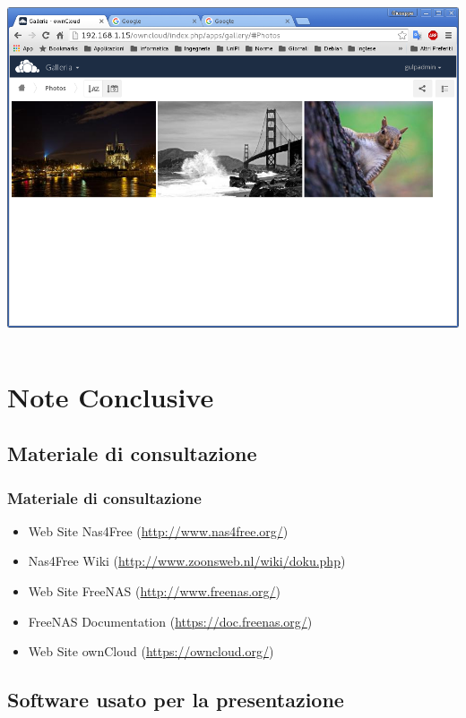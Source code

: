 \documentclass[11pt,xcolor=table]{beamer}
\begin{document}
\begin{frame}
\begin{columns}
\begin{column}{0.48\textwidth}
			\vspace{1mm}
			\includegraphics[width=\textwidth]{OC/OC5.png}
		\end{column}
	\end{columns}	
\end{frame}

\section{Note Conclusive}

\subsection{Materiale di consultazione}

\begin{frame}
	\frametitle{Materiale di consultazione}
	\begin{itemize}
		\item Web Site Nas4Free (\url{http://www.nas4free.org/})
		\item Nas4Free Wiki (\url{http://www.zoonsweb.nl/wiki/doku.php})
		\item Web Site FreeNAS (\url{http://www.freenas.org/})
		\item FreeNAS Documentation (\url{https://doc.freenas.org/})
		\item Web Site ownCloud (\url{https://owncloud.org/})
	\end{itemize}
\end{frame}

\subsection{Software usato per la presentazione}
\end{document}
